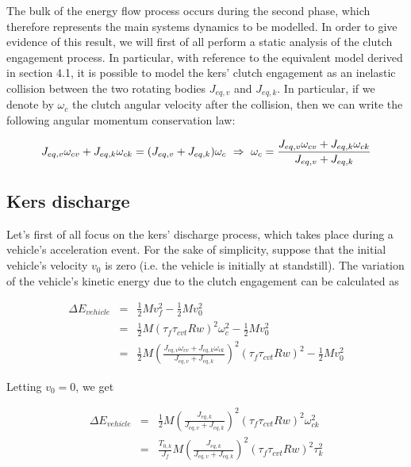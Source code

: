\documentclass[11pt]{article}
\begin{document}
The bulk of the energy flow process occurs during the second phase, which therefore represents the main systems dynamics to be modelled.
In order to give evidence of this result, we will first of all perform a static analysis of the clutch engagement process. In particular, with reference to the equivalent model derived in section 4.1, it is possible to model the kers' clutch engagement as an inelastic collision between the two rotating bodies $J_{eq,v}$ and $J_{eq,k}$. In particular, if we denote by $\omega_c$ the clutch angular velocity after the collision, then we can write the following angular momentum conservation law:

\begin{equation}
J_{eq,v}\omega_{cv}+J_{eq,k}\omega_{ck}=(J_{eq,v}+J_{eq,k})\omega_c\ \Rightarrow\ \omega_c= \frac{J_{eq,v}\omega_{cv}+J_{eq,k}\omega_{ck}}{J_{eq,v}+J_{eq,k}}\\
\end{equation}  

\subsection{Kers discharge}

Let's first of all focus on the kers' discharge process, which takes place during a vehicle's acceleration event. For the sake of simplicity, suppose that the initial vehicle's velocity $v_0$ is zero (i.e. the vehicle is initially at standstill). The variation of the vehicle's kinetic energy due to the clutch engagement can be calculated as

\begin{eqnarray}
	\Delta E_{vehicle}&=&\frac{1}{2}Mv_f^2-\frac{1}{2}Mv_0^2\\
	                  &=&\frac{1}{2}M(\tau_f \tau_{cvt}Rw)^2\omega_c^2-\frac{1}							  {2}Mv_0^2\\
	                  &=&\frac{1}{2}M\left(\frac{J_{eq,v}\omega_{cv}+J_{eq,k}       					  \omega_{ck}}{J_{eq,v}+J_{eq,k}}\right)^2(\tau_f \tau_{cvt}						  Rw)^2-\frac{1}{2}Mv_0^2
\end{eqnarray}  

Letting $v_0=0$, we get

\begin{eqnarray}
\Delta E_{vehicle}&=&\frac{1}{2}M\left(\frac{J_{eq,k}}{J_{eq,v}+J_{eq,k}}								 \right)^2(\tau_f \tau_{cvt}Rw)^2\omega_{ck}^2\\
                  &=&\frac{T_{0,k}}{J_f}M\left(\frac{J_{eq,k}}{J_{eq,v}+J_{eq,k}}					     \right)^2(\tau_f \tau_{cvt}Rw)^2 \tau_k^2
\end{eqnarray}
\end{document}
